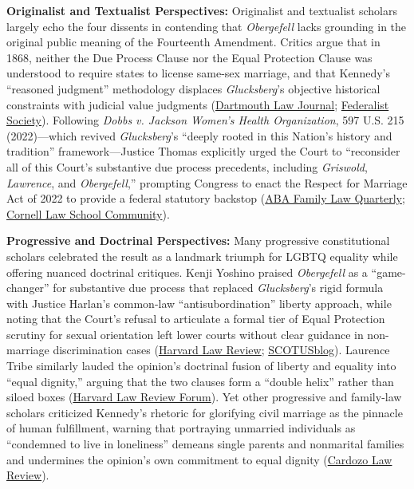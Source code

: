 \documentclass[12pt]{article}
\begin{document}
\textbf{Originalist and Textualist Perspectives:} Originalist and textualist scholars largely echo the four dissents in contending that \textit{Obergefell} lacks grounding in the original public meaning of the Fourteenth Amendment. Critics argue that in 1868, neither the Due Process Clause nor the Equal Protection Clause was understood to require states to license same-sex marriage, and that Kennedy's ``reasoned judgment'' methodology displaces \textit{Glucksberg}'s objective historical constraints with judicial value judgments (\href{https://dartmouthlawjournal.org/article/18840-obergefell-v-hodges-rethinking-justice-scalia-s-originalism.pdf}{Dartmouth Law Journal}; \href{https://fedsoc.org/case/obergefell-v-hodges}{Federalist Society}). Following \textit{Dobbs v. Jackson Women's Health Organization}, 597 U.S. 215 (2022)---which revived \textit{Glucksberg}'s ``deeply rooted in this Nation's history and tradition'' framework---Justice Thomas explicitly urged the Court to ``reconsider all of this Court's substantive due process precedents, including \textit{Griswold}, \textit{Lawrence}, and \textit{Obergefell},'' prompting Congress to enact the Respect for Marriage Act of 2022 to provide a federal statutory backstop (\href{https://www.americanbar.org/groups/family_law/resources/family-law-quarterly/2025-december/obergefell-victories-setbacks-protecting-rights-lgbtq-families/}{ABA Family Law Quarterly}; \href{https://community.lawschool.cornell.edu/wp-content/uploads/2024/08/Scaglia-final.pdf}{Cornell Law School Community}).

\textbf{Progressive and Doctrinal Perspectives:} Many progressive constitutional scholars celebrated the result as a landmark triumph for LGBTQ equality while offering nuanced doctrinal critiques. Kenji Yoshino praised \textit{Obergefell} as a ``game-changer'' for substantive due process that replaced \textit{Glucksberg}'s rigid formula with Justice Harlan's common-law ``antisubordination'' liberty approach, while noting that the Court's refusal to articulate a formal tier of Equal Protection scrutiny for sexual orientation left lower courts without clear guidance in non-marriage discrimination cases (\href{https://harvardlawreview.org/print/vol-129/a-new-birth-of-freedom-obergefell-v-hodges/}{Harvard Law Review}; \href{https://www.scotusblog.com/2015/11/academic-highlight-yoshino-on-obergefell-v-hodges/}{SCOTUSblog}). Laurence Tribe similarly lauded the opinion's doctrinal fusion of liberty and equality into ``equal dignity,'' arguing that the two clauses form a ``double helix'' rather than siloed boxes (\href{https://harvardlawreview.org/wp-content/uploads/2015/11/vol129_Tribe.pdf}{Harvard Law Review Forum}). Yet other progressive and family-law scholars criticized Kennedy's rhetoric for glorifying civil marriage as the pinnacle of human fulfillment, warning that portraying unmarried individuals as ``condemned to live in loneliness'' demeans single parents and nonmarital families and undermines the opinion's own commitment to equal dignity (\href{https://www.cardozolawreview.com/whats-wrong-with-obergefell/}{Cardozo Law Review}).
\end{document}
